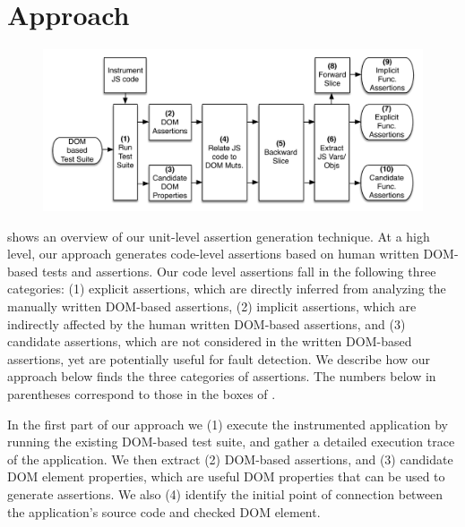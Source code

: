 \section{Approach} \label{Sec:approach}
\begin{figure}[!t]
  \centering
  \includegraphics[width=1\hsize]{fig/approachDiagram}
  \vspace{-0.3in} 
  \label{Fig:approachDiagram}
  \vspace{-0.2in} 
\end{figure}

 shows an overview of our unit-level assertion generation technique.
At a high level, our approach generates code-level assertions based on human written DOM-based tests and assertions. Our code level assertions fall in the following three categories: (1) explicit assertions, which are directly inferred from analyzing the manually written DOM-based assertions, (2) implicit assertions, which are indirectly affected by the human written DOM-based assertions, and (3) candidate assertions, which are not considered in the written DOM-based assertions, yet are potentially useful for fault detection. We describe how our approach below finds the three categories of assertions. The numbers below in parentheses correspond to those in the boxes of .

In the first part of our approach we (1) execute the instrumented application by running the existing DOM-based test suite, and gather a detailed execution trace of the application. We then extract (2) DOM-based assertions, and (3) candidate DOM element properties, which are useful DOM properties that can be used to generate assertions. We also (4) identify the initial point of connection between the application's source code and checked DOM element. 

